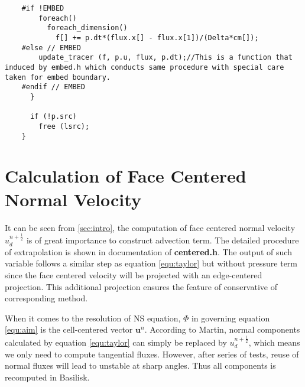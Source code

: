 \documentclass[a4paper]{article}
\newcommand{\para}[1]{\textbf{\emph{\textcolor{para}{#1}}}}
\begin{document}
\begin{center}
\end{center}


\begin{multicols}{2}
  \columnbreak
  \begin{verbatim}
    #if !EMBED
        foreach()
          foreach_dimension()
            f[] += p.dt*(flux.x[] - flux.x[1])/(Delta*cm[]);
    #else // EMBED
        update_tracer (f, p.u, flux, p.dt);//This is a function that induced by embed.h which conducts same procedure with special care taken for embed boundary.
    #endif // EMBED
      }

      if (!p.src)
        free (lsrc);
    }
  \end{verbatim}
\end{multicols}

\appendix
\section{Calculation of Face Centered Normal Velocity}
It can be seen from \ref{sec:intro}, the computation of face centered normal velocity $u_d^{n+ \frac{1}{2}}$ is of great importance to construct advection term. The detailed procedure of extrapolation is shown in documentation of \textbf{centered.h}. The output of such variable follows a similar step as equation \ref{equ:taylor} but without pressure term since the face centered velocity will be projected with an edge-centered projection. This additional projection ensures the feature of conservative of corresponding method.\par
When it comes to the resolution of NS equation, $\Phi$ in governing equation \ref{equ:aim} is the cell-centered vector $ \mathbf{u}^n$. According to Martin\cite{martin2000cell}, normal components calculated by equation \ref{equ:taylor} can simply be replaced by $u_d^{n+ \frac{1}{2}}$, which means we only need to compute tangential fluxes. However, after series of tests, reuse of normal fluxes will lead to unstable at sharp angles. Thus all components is recomputed in Basilisk\cite{popinet2003gerris}.
\printbibliography
\end{document}
